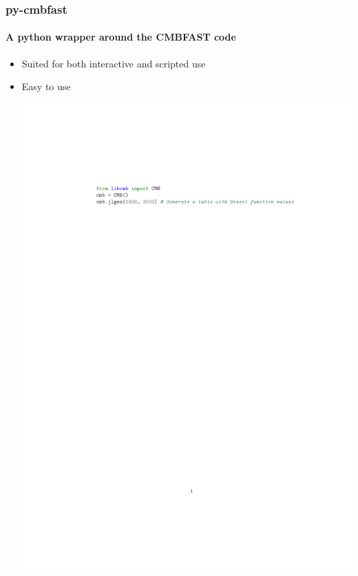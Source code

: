 \documentclass{beamer}
\begin{document}
	\begin{frame}
		\frametitle{py-cmbfast}
		\framesubtitle{A python wrapper around the CMBFAST code}
		\begin{itemize}
			\item Suited for both interactive and scripted use
			\item Easy to use
				\begin{center}
					\includegraphics{sample.pdf}
				\end{center}
		\end{itemize}
	\end{frame}
\end{document}
